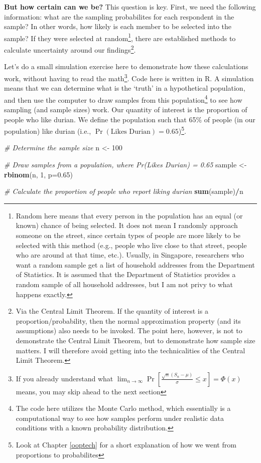 \documentclass[
  openany]{book}
\newenvironment{Shaded}{\begin{snugshade}}{\end{snugshade}}
\newcommand{\CommentTok}[1]{\textcolor[rgb]{0.56,0.35,0.01}{\textit{#1}}}
\newcommand{\DataTypeTok}[1]{\textcolor[rgb]{0.13,0.29,0.53}{#1}}
\newcommand{\DecValTok}[1]{\textcolor[rgb]{0.00,0.00,0.81}{#1}}
\newcommand{\FloatTok}[1]{\textcolor[rgb]{0.00,0.00,0.81}{#1}}
\newcommand{\KeywordTok}[1]{\textcolor[rgb]{0.13,0.29,0.53}{\textbf{#1}}}
\newcommand{\NormalTok}[1]{#1}
\newcommand{\OperatorTok}[1]{\textcolor[rgb]{0.81,0.36,0.00}{\textbf{#1}}}
\newcommand{\StringTok}[1]{\textcolor[rgb]{0.31,0.60,0.02}{#1}}
\begin{document}
\textbf{But how certain can we be?} This question is key. First, we need the following information: what are the sampling probabilites for each respondent in the sample? In other words, how likely is each member to be selected into the sample? If they were selected at random\footnote{Random here means that every person in the population has an equal (or known) chance of being selected. It does not mean I randomly approach someone on the street, since certain types of people are more likely to be selected with this method (e.g., people who live close to that street, people who are around at that time, etc.). Usually, in Singapore, researchers who want a random sample get a list of household addresses from the Department of Statistics. It is assumed that the Department of Statistics provides a random sample of all household addresses, but I am not privy to what happens exactly.}, there are established methods to calculate uncertainty around our findings\footnote{Via the Central Limit Theorem. If the quantity of interest is a proportion/probability, then the normal approximation property (and its assumptions) also needs to be invoked. The point here, however, is not to demonstrate the Central Limit Theorem, but to demonstrate how sample size matters. I will therefore avoid getting into the technicalities of the Central Limit Theorem.}.

Let's do a small simulation exercise here to demonstrate how these calculations work, without having to read the math\footnote{If you already understand what \(\lim_{n \to \infty} \Pr\left[\frac{\sqrt{n}(S_n - \mu)}{\sigma} \leq x \right]= \Phi(x)\) means, you may skip ahead to the next section}. Code here is written in R. A simulation means that we can determine what is the `truth' in a hypothetical population, and then use the computer to draw samples from this population\footnote{The code here utilizes the Monte Carlo method, which essentially is a computational way to see how samples perform under realistic data conditions with a known probability distribution.} to see how sampling (and sample sizes) work. Our quantity of interest is the proportion of people who like durian. We define the population such that 65\% of people (in our population) like durian (i.e., \(\Pr(\text{Likes Durian}) = 0.65\))\footnote{Look at Chapter \ref{ooptech} for a short explanation of how we went from proportions to probabilites}.

\begin{Shaded}
\begin{Highlighting}[]
\CommentTok{# Determine the sample size }
\NormalTok{n <-}\StringTok{ }\DecValTok{100}

\CommentTok{# Draw samples from a population, where Pr(Likes Durian) = 0.65}
\NormalTok{sample <-}\StringTok{ }\KeywordTok{rbinom}\NormalTok{(n, }\DecValTok{1}\NormalTok{, }\DataTypeTok{p=}\FloatTok{0.65}\NormalTok{)}

\CommentTok{# Calculate the proportion of people who report liking durian}
\KeywordTok{sum}\NormalTok{(sample)}\OperatorTok{/}\NormalTok{n}
\end{Highlighting}
\end{Shaded}
\end{document}
